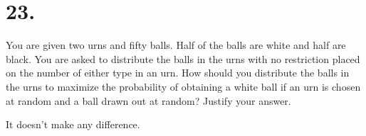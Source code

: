 \section*{23.}
You are given two urns and fifty balls. Half of the balls are white and half
are black. You are asked to distribute the balls in the urns with no restriction
placed on the number of either type in an urn. How should you distribute
the balls in the urns to maximize the probability of obtaining a white ball if
an urn is chosen at random and a ball drawn out at random? Justify your
answer.

\bigskip
\noindent
It doesn't make any difference.

